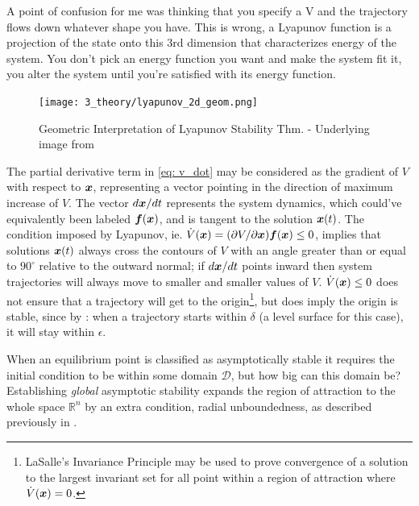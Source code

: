 \documentclass[12pt]{ucthesis}
\begin{document}
A point of confusion for me was thinking that you specify a V and the trajectory flows down whatever shape you have. This is wrong, a Lyapunov function is a projection of the state onto this 3rd dimension that characterizes energy of the system. You don't pick an energy function you want and make the system fit it, you alter the system until you're satisfied with its energy function.

	\begin{figure}[htb]
		\centering
		\texttt{[image: 3\_theory/lyapunov\_2d\_geom.png]}
		\caption{Geometric Interpretation of Lyapunov Stability Thm. - Underlying image from \citep{Astrom2008}}%
		\label{fig: lvl_surf}%
	\end{figure}

The partial derivative term in \autoref{eq: v_dot} may be considered as the gradient of $V$ with respect to $\boldsymbol{x}$, representing a vector pointing in the direction of maximum increase of $V$. The vector $d{\boldsymbol{x}}/dt$ represents the system dynamics, which could've equivalently been labeled $\boldsymbol{f}(\boldsymbol{x})$, and is tangent to the solution $\boldsymbol{x}(t)$. The condition imposed by Lyapunov, ie. $\dot{V}(\boldsymbol{x}) = (\partial V / \partial\boldsymbol{x}) \boldsymbol{f}(\boldsymbol{x}) \leq 0$, implies that solutions $\boldsymbol{x}(t)$ always cross the contours of $V$ with an angle greater than or equal to $90^\circ$ relative to the outward normal; if $d\boldsymbol{x}/dt$ points inward then system trajectories will always move to smaller and smaller values of $V$. $\dot{V}(\boldsymbol{x})\leq 0$ does not ensure that a trajectory will get to the origin\footnote{LaSalle's Invariance Principle \citep[Thm. 3.4]{Khalil1996} may be used to prove convergence of a solution to the largest invariant set for all point within a region of attraction where $\dot{V}(\boldsymbol{x})=0$.}, but does imply the origin is stable, since by : when a trajectory starts within $\delta$ (a level surface for this case), it will stay within $\epsilon$. 

When an equilibrium point is classified as asymptotically stable it requires the initial condition to be within some domain $\mathcal{D}$, but how big can this domain be? Establishing \textit{global} asymptotic stability expands the region of attraction to the whole space $\mathbb{R}^n$ by an extra condition, radial unboundedness, as described previously in .
\end{document}
